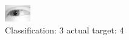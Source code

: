 \begin{figure}[h!]
\begin{center}
\includegraphics[width=0.60\columnwidth]{figures/ID2414_class_3_target_4.png}
\end{center}
\caption{ Classification: 3 actual target: 4}
\label{fig:ID2414_class_3_target_4}
\end{figure}
